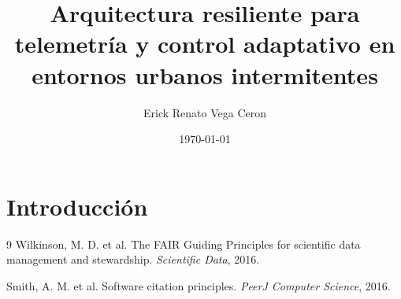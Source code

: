 \documentclass[12pt,letterpaper]{report}
\title{Arquitectura resiliente para telemetría y control adaptativo en entornos urbanos intermitentes}
\author{Erick Renato Vega Ceron}
\date{\today}
\begin{document}
\maketitle
\tableofcontents

\chapter{Introducción}




\begin{thebibliography}{9}
Wilkinson, M. D. et al. The FAIR Guiding Principles for scientific data management and stewardship. \emph{Scientific Data}, 2016.

Smith, A. M. et al. Software citation principles. \emph{PeerJ Computer Science}, 2016.
\end{thebibliography}
\end{document}
